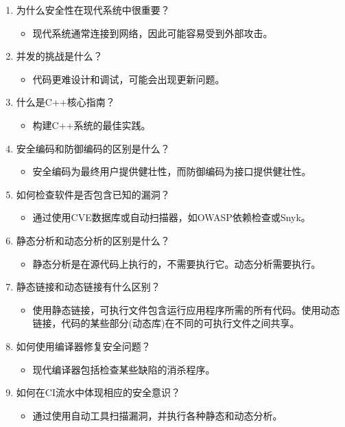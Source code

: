 \begin{enumerate}
\item
为什么安全性在现代系统中很重要？
\begin{itemize}
\item 
现代系统通常连接到网络，因此可能容易受到外部攻击。
\end{itemize}

\item
并发的挑战是什么？
\begin{itemize}
\item 
代码更难设计和调试，可能会出现更新问题。
\end{itemize}

\item
什么是C++核心指南？
\begin{itemize}
\item 
构建C++系统的最佳实践。
\end{itemize}

\item
安全编码和防御编码的区别是什么？
\begin{itemize}
\item 
安全编码为最终用户提供健壮性，而防御编码为接口提供健壮性。
\end{itemize}

\item
如何检查软件是否包含已知的漏洞？
\begin{itemize}
\item 
通过使用CVE数据库或自动扫描器，如OWASP依赖检查或Snyk。
\end{itemize}

\item
静态分析和动态分析的区别是什么？
\begin{itemize}
\item 
静态分析是在源代码上执行的，不需要执行它。动态分析需要执行。
\end{itemize}

\item
静态链接和动态链接有什么区别？
\begin{itemize}
\item 
使用静态链接，可执行文件包含运行应用程序所需的所有代码。使用动态链接，代码的某些部分(动态库)在不同的可执行文件之间共享。
\end{itemize}

\item
如何使用编译器修复安全问题？
\begin{itemize}
\item 
现代编译器包括检查某些缺陷的消杀程序。
\end{itemize}

\item
如何在CI流水中体现相应的安全意识？
\begin{itemize}
\item 
通过使用自动工具扫描漏洞，并执行各种静态和动态分析。
\end{itemize}
\end{enumerate}